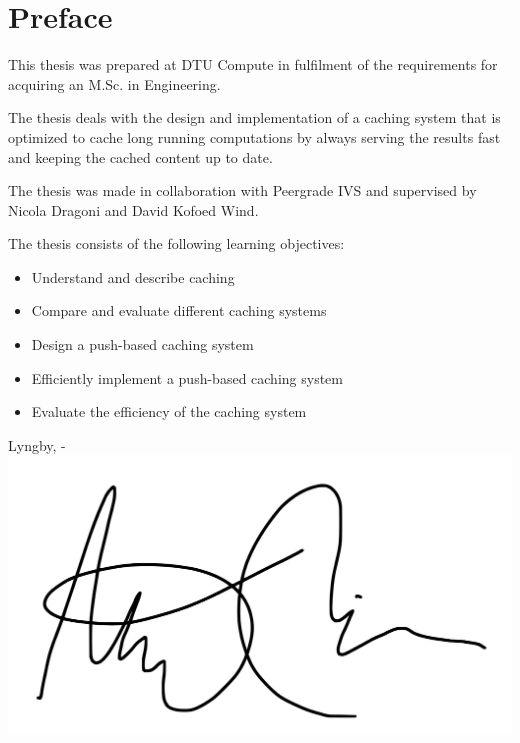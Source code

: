 \chapter{Preface}

This thesis was prepared at DTU Compute in fulfilment of the requirements for acquiring an M.Sc. in Engineering.

The thesis deals with the design and implementation of a caching system that is optimized to cache long running computations by always serving the results fast and keeping the cached content up to date.

The thesis was made in collaboration with Peergrade IVS and supervised by Nicola Dragoni and David Kofoed Wind.

The thesis consists of the following learning objectives:

\begin{itemize}
  \item Understand and describe caching
  \item Compare and evaluate different caching systems
  \item Design a push-based caching system
  \item Efficiently implement a push-based caching system
  \item Evaluate the efficiency of the caching system
\end{itemize}

\vspace{20mm}
\begin{center}
    \hspace{20mm} Lyngby, \thesishandin-\thesisyear
    \vspace{5mm}
    \newline
    \includegraphics[scale=0.25]{signature.png}
\end{center}
\begin{flushright}
    \thesisauthor
\end{flushright}
